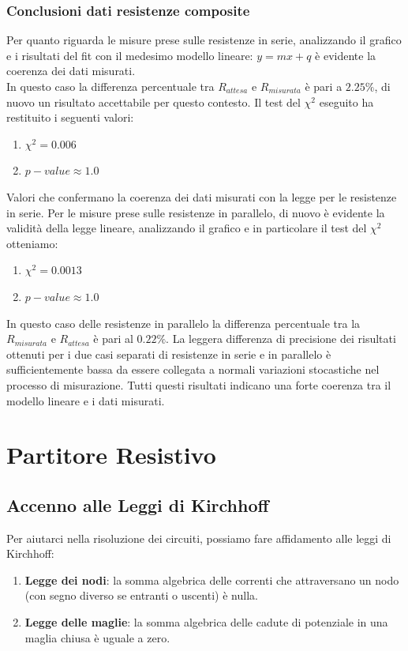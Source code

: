 \documentclass[letterpaper,12pt]{article}
\begin{document}
\subsubsection{Conclusioni dati resistenze composite}
Per quanto riguarda le misure prese sulle resistenze in serie, analizzando il grafico e i risultati del fit con il medesimo modello lineare: $y=mx+q$ è evidente la coerenza dei dati misurati.\\
In questo caso la differenza percentuale tra $R_{attesa}$ e $R_{misurata}$ è pari a $2.25\%$, di nuovo un risultato accettabile per questo contesto.
Il test del $\chi^2$ eseguito ha restituito i seguenti valori: 
\begin{enumerate}
    \item $\chi^2 = 0.006$
    \item $p-value \approx 1.0$
\end{enumerate}
Valori che confermano la coerenza dei dati misurati con la legge per le resistenze in serie.
Per le misure prese sulle resistenze in parallelo, di nuovo è evidente la validità della legge lineare, analizzando il grafico e in particolare il test del $\chi^2$ otteniamo:
\begin{enumerate}
    \item $\chi^2 = 0.0013$
    \item $p-value \approx 1.0$
\end{enumerate}
In questo caso delle resistenze in parallelo la differenza percentuale tra la $R_{misurata}$ e $R_{attesa}$ è pari al $0.22\%$.
La leggera differenza di precisione dei risultati ottenuti per i due casi separati di resistenze in serie e in parallelo è sufficientemente bassa da essere collegata a normali variazioni stocastiche nel processo di misurazione.
Tutti questi risultati indicano una forte coerenza tra il modello lineare e i dati misurati.
\section{Partitore Resistivo}

\subsection{Accenno alle Leggi di Kirchhoff}
Per aiutarci nella risoluzione dei circuiti, possiamo fare affidamento alle leggi di Kirchhoff:
\begin{enumerate}
    \item \textbf{Legge dei nodi}: la somma algebrica delle correnti che attraversano un nodo (con segno diverso se entranti o uscenti) è nulla.
    \item \textbf{Legge delle maglie}: la somma algebrica delle cadute di potenziale in una maglia chiusa è uguale a zero.
\end{enumerate}
\end{document}
